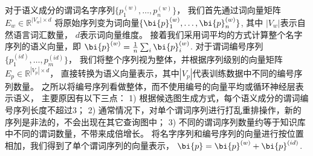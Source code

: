 
对于语义成分的谓词名字序列$\{p_1^{(w)}, \dots, p_n^{(w)}\}$，
我们首先通过词向量矩阵$E_w \in \mathbb{R}^{|V_w| \times d}$
将原始序列变为词向量$\{\bi{p}_1^{(w)}, \dots, \bi{p}_n^{(w)}\}$,
其中 $|V_w|$表示自然语言词汇数量，
$d$表示词向量维度。
接着我们采用词平均的方式计算整个名字序列的语义向量，即
$\bi{p}^{(w)} = \frac{1}{n} \sum_{i}{\bi{p}_i^{(w)}}$.
对于谓词编号序列$\{p_1^{(id)}, \dots, p_m^{(id)}\}$，
我们将整个序列视为整体，并根据序列级别的向量矩阵$E_p \in \mathbb{R}^{|V_p| \times d}$，
直接转换为语义向量表示，其中$|V_p|$代表训练数据中不同的编号序列数量。
之所以将编号序列看做整体，而不使用编号的向量平均或循环神经层表示语义，
主要原因有以下三点：
1) 根据候选图生成方式，每个语义成分的谓词编号序列长度不超过3；
2) 通常情况下，对单个谓词序列进行打乱重排操作，新的序列是非法的，不会出现在其它查询图中；
3) 不同的谓词序列数量约等于知识库中不同的谓词数量，不带来成倍增长。
将名字序列和编号序列的向量进行按位置相加，我们得到了单个谓词序列的向量表示，
$\bi{p} = \bi{p}^{(w)} + \bi{p}^{(id)}$.

